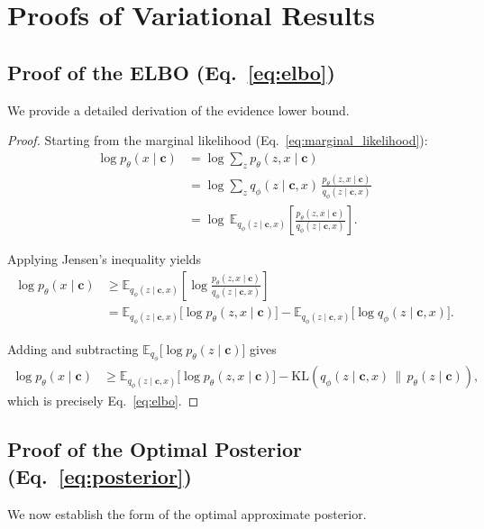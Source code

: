 \appendix
\section{Proofs of Variational Results}
\label{app:proofs}

\subsection{Proof of the ELBO (Eq.~\ref{eq:elbo})}
We provide a detailed derivation of the evidence lower bound.

\begin{proof}
Starting from the marginal likelihood (Eq.~\ref{eq:marginal_likelihood}):
\begin{align*}
\log p_\theta(x \mid \mathbf{c})
&= \log \sum_{z} p_\theta(z, x \mid \mathbf{c}) \\
&= \log \sum_{z} q_\phi(z \mid \mathbf{c}, x) \, \frac{p_\theta(z, x \mid \mathbf{c})}{q_\phi(z \mid \mathbf{c}, x)} \\
&= \log \, \mathbb{E}_{q_\phi(z \mid \mathbf{c}, x)} \!\left[ \frac{p_\theta(z, x \mid \mathbf{c})}{q_\phi(z \mid \mathbf{c}, x)} \right].
\end{align*}

Applying Jensen’s inequality yields
\begin{align*}
\log p_\theta(x \mid \mathbf{c})
&\geq \mathbb{E}_{q_\phi(z \mid \mathbf{c}, x)} \!\left[ \log \frac{p_\theta(z, x \mid \mathbf{c})}{q_\phi(z \mid \mathbf{c}, x)} \right] \\
&= \mathbb{E}_{q_\phi(z \mid \mathbf{c}, x)} \!\big[\log p_\theta(z, x \mid \mathbf{c})\big] 
- \mathbb{E}_{q_\phi(z \mid \mathbf{c}, x)} \!\big[\log q_\phi(z \mid \mathbf{c}, x)\big].
\end{align*}

Adding and subtracting $\mathbb{E}_{q_\phi}\big[\log p_\theta(z \mid \mathbf{c})\big]$ gives
\begin{align*}
\log p_\theta(x \mid \mathbf{c})
&\geq \mathbb{E}_{q_\phi(z \mid \mathbf{c}, x)} \!\big[\log p_\theta(z, x \mid \mathbf{c})\big] 
- \mathrm{KL}\!\left(q_\phi(z \mid \mathbf{c}, x)\,\|\,p_\theta(z \mid \mathbf{c})\right),
\end{align*}
which is precisely Eq.~\ref{eq:elbo}.
\end{proof}

\subsection{Proof of the Optimal Posterior (Eq.~\ref{eq:posterior})}
We now establish the form of the optimal approximate posterior.

